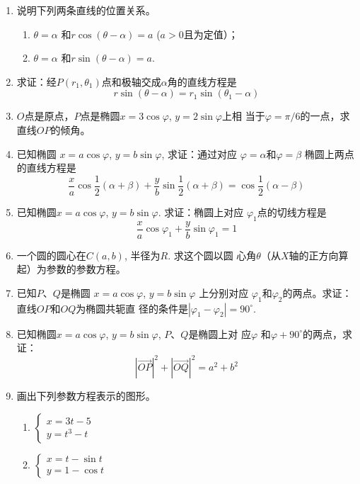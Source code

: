 \begin{enumerate}
\item 说明下列两条直线的位置关系。
\begin{enumerate}
    \item $\theta =\alpha$ 和$r \cos(\theta-\alpha)=a$ ($a>0$且为定值）；
\item $\theta =\alpha$ 和$r\sin(\theta -\alpha)=a$.
\end{enumerate}

\item 求证：经$P(r_1,\theta_1)$点和极轴交成$\alpha$角的直线方程是
\[r\sin(\theta -\alpha )=r_1\sin(\theta_1-\alpha)\]
\item $O$点是原点，$P$点是椭圆$x=3\cos\varphi$, $y=2\sin\varphi$上相
当于$\varphi=\pi/6$的一点，求直线$OP$的倾角。
\item 已知椭圆
$x=a\cos\varphi$, $y=b\sin\varphi$, 求证：通过对应
$\varphi =\alpha$和$\varphi =\beta$ 椭圆上两点的直线方程是
\[\frac{x}{a}\cos\frac{1}{2}(\alpha+\beta )+\frac{y}{b}\sin\frac{1}{2}(\alpha+\beta )=\cos\frac{1}{2}(\alpha-\beta )\]
\item 已知椭圆$x=a\cos\varphi$, $y=b\sin\varphi$. 求证：椭圆上对应
$\varphi_1$点的切线方程是
\[\frac{x}{a}\cos\varphi_1+\frac{y}{b}\sin\varphi_1=1\]
\item 一个圆的圆心在$C(a,b)$, 半径为$R$. 求这个圆以圆
心角$\theta$（从$X$轴的正方向算起）为参数的参数方程。
\item 已知$P$、$Q$是椭圆
$x=a\cos\varphi$, $y=b\sin\varphi$ 上分别对应
$\varphi_1$和$\varphi_2$的两点。求证：直线$OP$和$OQ$为椭圆共轭直
径的条件是$|\varphi_1-\varphi_2|=90^{\circ}$.
\item 已知椭圆$x=a\cos\varphi$, $y=b\sin\varphi$, $P$、$Q$是椭圆上对
应$\varphi$ 和$\varphi +90^{\circ}$的两点，求证：
\[|\Vec{OP}|^2+|\Vec{OQ}|^2=a^2+b^2\]

\item 画出下列参数方程表示的图形。
\begin{multicols}{2}
\begin{enumerate}
    \item $\begin{cases}
        x=3t-5\\y=t^3-t
    \end{cases}$
    \item $\begin{cases}
        x=t-\sin t\\ y=1-\cos t
    \end{cases}$
\end{enumerate}
\end{multicols}
\end{enumerate}


